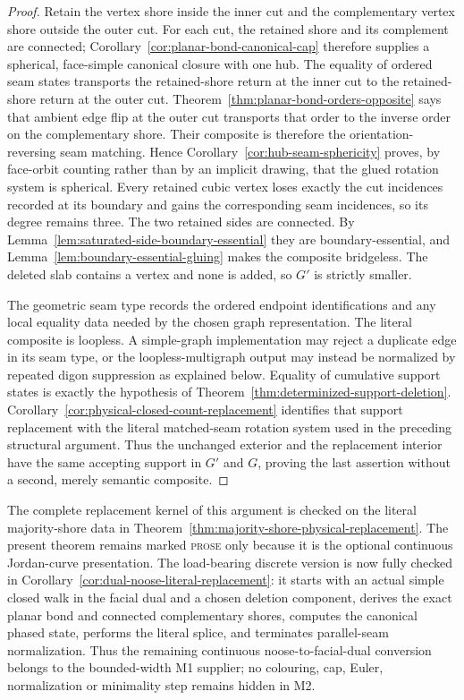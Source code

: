 \begin{proof}
Retain the vertex shore inside the inner cut and the complementary vertex
shore outside the outer cut.  For each cut, the retained shore and its
complement are connected; Corollary~\ref{cor:planar-bond-canonical-cap}
therefore supplies a spherical, face-simple canonical closure with one hub.
The equality of ordered seam states transports the retained-shore return at
the inner cut to the retained-shore return at the outer cut.
Theorem~\ref{thm:planar-bond-orders-opposite} says that ambient edge flip at
the outer cut transports that order to the inverse order on the complementary
shore.  Their composite is therefore the orientation-reversing seam matching.
Hence
Corollary~\ref{cor:hub-seam-sphericity} proves, by face-orbit counting rather
than by an implicit drawing, that the glued rotation system is spherical.
Every retained cubic
vertex loses exactly the cut incidences recorded at its boundary and gains
the corresponding seam incidences, so its degree remains three.  The two
retained sides are connected.  By
Lemma~\ref{lem:saturated-side-boundary-essential} they are
boundary-essential, and Lemma~\ref{lem:boundary-essential-gluing} makes the
composite bridgeless.  The deleted slab contains a vertex and none is added,
so \(G'\) is strictly smaller.

The geometric seam type records the ordered endpoint identifications and any
local equality data needed by the chosen graph representation.  The literal
composite is loopless.  A simple-graph implementation may reject a duplicate
edge in its seam type, or the loopless-multigraph output may instead be
normalized by repeated digon suppression as explained below.  Equality of
cumulative support states is exactly the hypothesis of
Theorem~\ref{thm:determinized-support-deletion}.
Corollary~\ref{cor:physical-closed-count-replacement} identifies that support
replacement with the literal matched-seam rotation system used in the
preceding structural argument.  Thus the unchanged exterior and the
replacement interior have the same accepting support in \(G'\) and \(G\),
proving the last assertion without a second, merely semantic composite.
\end{proof}

The complete replacement kernel of this argument is checked on the literal
majority-shore data in
Theorem~\ref{thm:majority-shore-physical-replacement}.  The present theorem
remains marked \textsc{prose} only because it is the optional continuous
Jordan-curve presentation.  The load-bearing discrete version is now fully
checked in Corollary~\ref{cor:dual-noose-literal-replacement}: it starts with
an actual simple closed walk in the facial dual and a chosen deletion
component, derives the exact planar bond and connected complementary shores,
computes the canonical phased state, performs the literal splice, and
terminates parallel-seam normalization.  Thus the remaining continuous
noose-to-facial-dual conversion belongs to the bounded-width M1 supplier; no
colouring, cap, Euler, normalization or minimality step remains hidden in M2.

